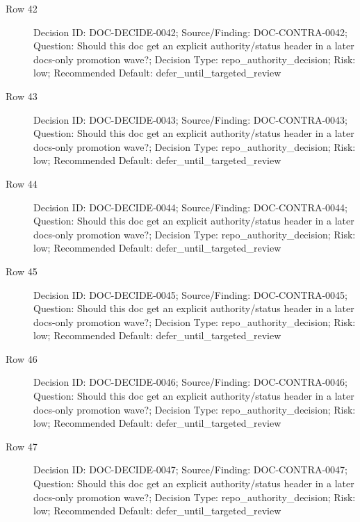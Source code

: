 \documentclass[9pt,a4paper,openany]{book}
\begin{document}
\begin{description}
\item[Row 42] Decision ID: DOC-\allowbreak{}DECIDE-\allowbreak{}0042; Source/\allowbreak{}Finding: DOC-\allowbreak{}CONTRA-\allowbreak{}0042; Question: Should this doc get an explicit authority/\allowbreak{}status header in a later docs-\allowbreak{}only promotion wave?; Decision Type: repo\_\allowbreak{}authority\_\allowbreak{}decision; Risk: low; Recommended Default: defer\_\allowbreak{}until\_\allowbreak{}targeted\_\allowbreak{}review
\item[Row 43] Decision ID: DOC-\allowbreak{}DECIDE-\allowbreak{}0043; Source/\allowbreak{}Finding: DOC-\allowbreak{}CONTRA-\allowbreak{}0043; Question: Should this doc get an explicit authority/\allowbreak{}status header in a later docs-\allowbreak{}only promotion wave?; Decision Type: repo\_\allowbreak{}authority\_\allowbreak{}decision; Risk: low; Recommended Default: defer\_\allowbreak{}until\_\allowbreak{}targeted\_\allowbreak{}review
\item[Row 44] Decision ID: DOC-\allowbreak{}DECIDE-\allowbreak{}0044; Source/\allowbreak{}Finding: DOC-\allowbreak{}CONTRA-\allowbreak{}0044; Question: Should this doc get an explicit authority/\allowbreak{}status header in a later docs-\allowbreak{}only promotion wave?; Decision Type: repo\_\allowbreak{}authority\_\allowbreak{}decision; Risk: low; Recommended Default: defer\_\allowbreak{}until\_\allowbreak{}targeted\_\allowbreak{}review
\item[Row 45] Decision ID: DOC-\allowbreak{}DECIDE-\allowbreak{}0045; Source/\allowbreak{}Finding: DOC-\allowbreak{}CONTRA-\allowbreak{}0045; Question: Should this doc get an explicit authority/\allowbreak{}status header in a later docs-\allowbreak{}only promotion wave?; Decision Type: repo\_\allowbreak{}authority\_\allowbreak{}decision; Risk: low; Recommended Default: defer\_\allowbreak{}until\_\allowbreak{}targeted\_\allowbreak{}review
\item[Row 46] Decision ID: DOC-\allowbreak{}DECIDE-\allowbreak{}0046; Source/\allowbreak{}Finding: DOC-\allowbreak{}CONTRA-\allowbreak{}0046; Question: Should this doc get an explicit authority/\allowbreak{}status header in a later docs-\allowbreak{}only promotion wave?; Decision Type: repo\_\allowbreak{}authority\_\allowbreak{}decision; Risk: low; Recommended Default: defer\_\allowbreak{}until\_\allowbreak{}targeted\_\allowbreak{}review
\item[Row 47] Decision ID: DOC-\allowbreak{}DECIDE-\allowbreak{}0047; Source/\allowbreak{}Finding: DOC-\allowbreak{}CONTRA-\allowbreak{}0047; Question: Should this doc get an explicit authority/\allowbreak{}status header in a later docs-\allowbreak{}only promotion wave?; Decision Type: repo\_\allowbreak{}authority\_\allowbreak{}decision; Risk: low; Recommended Default: defer\_\allowbreak{}until\_\allowbreak{}targeted\_\allowbreak{}review

\end{description}
\end{document}
